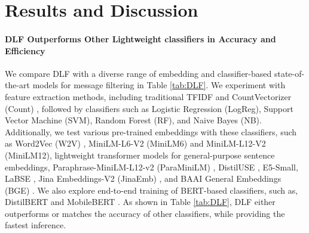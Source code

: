 \documentclass[11pt]{article}
\begin{document}
\section{Results and Discussion}


\paragraph{DLF Outperforms Other Lightweight classifiers in Accuracy and Efficiency}
We compare DLF with a diverse range of embedding and classifier-based state-of-the-art models for message filtering in Table \ref{tab:DLF}. We experiment with feature extraction methods, including traditional TFIDF \cite{salton1988term} and CountVectorizer (Count) \cite{manning1999foundations}, followed by classifiers such as Logistic Regression (LogReg), Support Vector Machine (SVM), Random Forest (RF), and Naive Bayes (NB). Additionally, we test various pre-trained embeddings with these classifiers, such as Word2Vec (W2V) \cite{mikolov2013efficient}, MiniLM-L6-V2 (MiniLM6) and MiniLM-L12-V2 (MiniLM12), lightweight transformer models for general-purpose sentence embeddings, Paraphrase-MiniLM-L12-v2 (ParaMiniLM) \cite{reimers2019sentence}, DistilUSE \cite{reimers2019sentence}, E5-Small, LaBSE \cite{feng2020language}, Jina Embeddings-V2 (JinaEmb) \cite{jinaai2023}, and BAAI General Embeddings (BGE) \cite{bge-m3}. We also explore end-to-end training of BERT-based classifiers, such as, DistilBERT \cite{Sanh-DistilBERT-2019} and MobileBERT \cite{sun-etal-2020-mobilebert}. As shown in Table \ref{tab:DLF}, DLF either outperforms or matches the accuracy of other classifiers, while providing the fastest inference.
\end{document}
